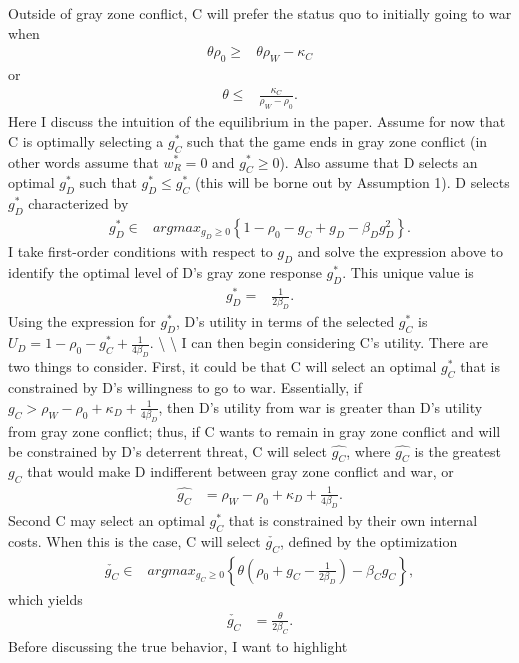 \documentclass[
]{article}
\begin{document}
Outside of gray zone conflict, C will prefer the status quo to initially
going to war when \begin{align*}
\theta\rho_{0}\geq & \theta\rho_{W}-\kappa_{C}
\end{align*} or \begin{align*}
\theta\leq & \frac{\kappa_{C}}{\rho_{W}-\rho_{0}}.
\end{align*} Here I discuss the intuition of the equilibrium in the
paper. Assume for now that C is optimally selecting a \(g_{C}^{*}\) such
that the game ends in gray zone conflict (in other words assume that
\(w_{R}^{*}=0\) and \(g_{C}^{*}\geq0\)). Also assume that D selects an
optimal \(g_{D}^{*}\) such that \(g_{D}^{*}\leq g_{C}^{*}\) (this will
be borne out by Assumption 1). D selects \(g_{D}^{*}\) characterized by
\begin{align*}
g_{D}^{*}\in & argmax_{g_{D}\geq0}\left\{ 1-\rho_{0}-g_{C}+g_{D}-\beta_{D}g_{D}^{2}\right\} .
\end{align*} I take first-order conditions with respect to \(g_{D}\) and
solve the expression above to identify the optimal level of D's gray
zone response \(g_{D}^{*}\). This unique value is \begin{align*}
g_{D}^{*}= & \frac{1}{2\beta_{D}}.
\end{align*} Using the expression for \(g_{D}^{*}\), D's utility in
terms of the selected \(g_{C}^{*}\) is
\(U_{D}=1-\rho_{0}-g_{C}^{*}+\frac{1}{4\beta_{D}}\). \textbackslash{}
\textbackslash{} I can then begin considering C's utility. There are two
things to consider. First, it could be that C will select an optimal
\(g_{C}^{*}\) that is constrained by D's willingness to go to war.
Essentially, if
\(g_{C}>\rho_{W}-\rho_{0}+\kappa_{D}+\frac{1}{4\beta_{D}}\), then D's
utility from war is greater than D's utility from gray zone conflict;
thus, if C wants to remain in gray zone conflict and will be constrained
by D's deterrent threat, C will select \(\hat{g_{C}}\), where
\(\hat{g_{C}}\) is the greatest \(g_{C}\) that would make D indifferent
between gray zone conflict and war, or \begin{align*}
\hat{g_{C}} & =\rho_{W}-\rho_{0}+\kappa_{D}+\frac{1}{4\beta_{D}}.
\end{align*} Second C may select an optimal \(g_{C}^{*}\) that is
constrained by their own internal costs. When this is the case, C will
select \(\check{g_{C}}\), defined by the optimization \begin{align*}
\check{g_{C}}\in & argmax_{g_{C}\geq0}\left\{ \theta\left(\rho_{0}+g_{C}-\frac{1}{2\beta_{D}}\right)-\beta_{C}g_{C}\right\} ,
\end{align*} which yields \begin{align*}
\check{g_{C}} & =\frac{\theta}{2\beta_{C}}.
\end{align*} Before discussing the true behavior, I want to highlight
\end{document}

